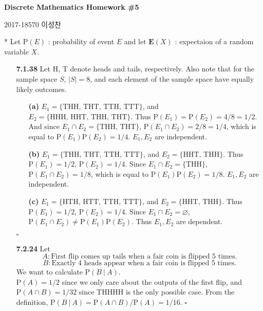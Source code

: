 \documentclass{article}
\newcommand*{\qed}{\hfill\ensuremath{\square}}%
\newcommand*{\pr}{\mathrm{P}}%
\newcommand*{\ex}{\mathrm{\mathbf{E}}}%
\begin{document}
\begin{center}
\textbf{\Large Discrete Mathematics Homework \#5}
\end{center}
\begin{flushright}
{\large 2017-18570 이성찬}\\
\end{flushright}

* Let $\pr(E)$ : probability of event $E$ and let $\ex(X)$ : expectaion of a random variable $X$.
\begin{itemize}
\item[\large \textbf{7.1.38}] Let H, T denote heads and tails, respectively. Also note that for the sample space $S$, $\left|S\right| = 8$, and each element of the sample space have equally likely outcomes.
	\begin{itemize}
		\item[\textbf{(a)}] $E_1=\{\text{THH, THT, TTH, TTT}\}$, and $E_2=\{\text{HHH, HHT, THH, THT}\}$. Thus $\pr(E_1) = \pr(E_2) = 4/8 = 1/2$. And since $E_1 \cap E_2 = \{\text{THH, THT}\}$, $\pr(E_1\cap E_2) = 2/8 = 1/4$, which is equal to $\pr(E_1)\pr(E_2) = 1/4$. $E_1, E_2$ are independent. 
		\item[\textbf{(b)}] $E_1=\{\text{THH, THT, TTH, TTT}\}$, and $E_2=\{\text{HHT, THH}\}$. Thus $\pr(E_1) = 1/2$, $\pr(E_2) = 1/4$. Since $E_1 \cap E_2 = \{\text{THH}\}$, $\pr(E_1\cap E_2) = 1/8$, which is equal to $\pr(E_1)\pr(E_2)=1/8$. $E_1, E_2$ are independent.
		\item[\textbf{(c)}] $E_1 = \{\text{HTH, HTT, TTH, TTT}\}$, and $E_2=\{\text{HHT, THH}\}$. Thus $\pr(E_1) = 1/2$, $\pr(E_2) = 1/4$. Since $E_1 \cap E_2 = \varnothing$, $\pr(E_1\cap E_2) \neq \pr(E_1)\pr(E_2)$. Thus $E_1, E_2$ are dependent. 
	\end{itemize} \qed
	
\item[\large \textbf{7.2.24}] Let
	$$A: \text{First flip comes up tails when a fair coin is flipped 5 times.}$$
	$$B: \text{Exactly 4 heads appear when a fair coin is flipped 5 times.}$$
	We want to calculate $\pr(B\:|\:A)$.\\
	$\pr(A) = 1/2$ since we only care about the outputs of the first flip, and $\pr(A\cap B) = 1/32$ since THHHH is the only possible case. From the definition, $\pr(B\:|\:A) = {\pr(A\cap B)}/{\pr(A)} = 1/16$. \qed
	

\end{itemize}
\end{document}
